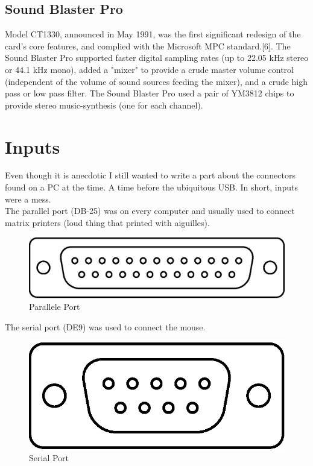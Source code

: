 \documentclass[book.tex]{subfiles}
\begin{document}
  \subsection{Sound Blaster Pro}
  Model CT1330, announced in May 1991, was the first significant redesign of the card's core features, and complied with the Microsoft MPC standard.[6]. The Sound Blaster Pro supported faster digital sampling rates (up to 22.05 kHz stereo or 44.1 kHz mono), added a "mixer" to provide a crude master volume control (independent of the volume of sound sources feeding the mixer), and a crude high pass or low pass filter. The Sound Blaster Pro used a pair of YM3812 chips to provide stereo music-synthesis (one for each channel).
\section{Inputs}
Even though it is anecdotic I still wanted to write a part about the connectors found on a PC at the time. A time before the ubiquitous USB. In short, inputs were a mess.\\

The parallel port (DB-25) was on every computer and usually used to connect matrix printers (loud thing that printed with aiguilles).
 \begin{figure}[H]
\centering
\includegraphics[scale=0.7]{imgs/ports/DB-25_parallel_port.eps}
%
\caption{Parallele Port}
\label{fig:parallelPort}
\end{figure}


The serial port (DE9) was used to connect the mouse.
 \begin{figure}[H]
\centering
\includegraphics[scale=0.7]{imgs/ports/DE9_serial_port.eps}
%
\caption{Serial Port}
\label{fig:serialPort}
\end{figure}
\end{document}
